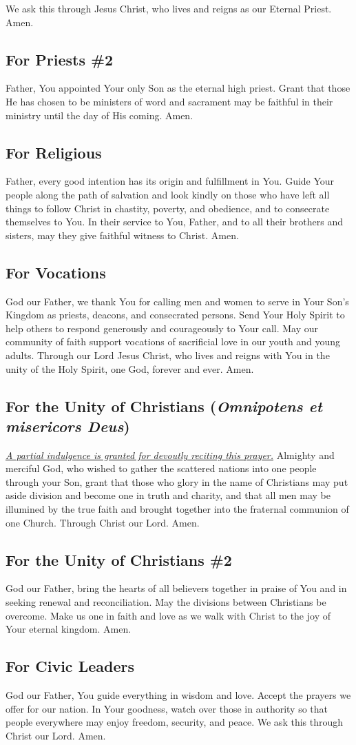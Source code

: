 \documentclass[12pt]{article}
\newcommand{\prayertitle}[1]{\subsection{#1}}
\newcommand{\indulgencedprayertitle}[1]{\prayertitle{#1 \protect\kreuz}}
\newcommand{\foreign}[1]{\textsl{#1}}
\newcommand{\note}[1]{{\small{\textsl{#1}}}\newline}
\newcommand{\linkednote}[2]{\hyperlink{#1}{\note{#2}}}
\begin{document}
We ask this through Jesus Christ, who lives and reigns as our Eternal Priest.
Amen.

\prayertitle{For Priests \#2}
Father, You appointed Your only Son as the eternal high priest.
Grant that those He has chosen to be ministers of word and sacrament may be faithful in their ministry until the day of His coming.
Amen.

\prayertitle{For Religious}
Father, every good intention has its origin and fulfillment in You.
Guide Your people along the path of salvation and look kindly on those who have left all things to follow Christ in chastity, poverty, and obedience, and to consecrate themselves to You.
In their service to You, Father, and to all their brothers and sisters, may they give faithful witness to Christ.
Amen.

\prayertitle{For Vocations}
God our Father, we thank You for calling men and women to serve in Your Son’s Kingdom as priests, deacons, and consecrated persons.
Send Your Holy Spirit to help others to respond generously and courageously to Your call.
May our community of faith support vocations of sacrificial love in our youth and young adults.
Through our Lord Jesus Christ, who lives and reigns with You in the unity of the Holy
Spirit, one God, forever and ever.
Amen.

\indulgencedprayertitle{For the Unity of Christians (\foreign{Omnipotens et misericors Deus})}
\linkednote{grant11}{A partial indulgence is granted for devoutly reciting this prayer.}
Almighty and merciful God, who wished to gather the scattered nations into one people
through your Son, grant that those who glory in the name of Christians may put aside
division and become one in truth and charity, and that all men may be illumined by the
true faith and brought together into the fraternal communion of one Church.
Through Christ our Lord. Amen.

\prayertitle{For the Unity of Christians \#2}
God our Father, bring the hearts of all believers together in praise of You and in seeking renewal and reconciliation.
May the divisions between Christians be overcome.
Make us one in faith and love as we walk with Christ to the joy of Your eternal kingdom.
Amen.
\newpage
\prayertitle{For Civic Leaders}
God our Father, You guide everything in wisdom and love.
Accept the prayers we offer for our nation.
In Your goodness, watch over those in authority so that people everywhere may enjoy freedom, security, and peace.
We ask this through Christ our Lord.
Amen.
\end{document}
